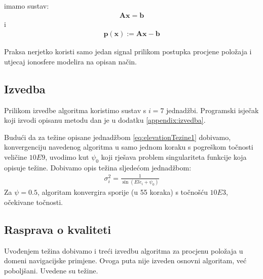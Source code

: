 \documentclass[a4paper,twoside,12pt]{memoir} %
\begin{document}
imamo sustav:
\begin{align*}
\mathbf{A}\mathbf{x} = \mathbf{b}
\end{align*} i
\begin{align*}
\mathbf{p}(\mathbf{x}) := \mathbf{A}\mathbf{x} - \mathbf{b}
\end{align*}


Praksa nerjetko koristi samo jedan signal prilikom postupka procjene položaja i utjecaj ionosfere modelira 
na opisan način.

\subsection{Izvedba }
Prilikom izvedbe algoritma koristimo sustav s $i = 7$ jednadžbi.
Programski isječak koji izvodi opisanu metodu dan je u dodatku \ref{appendix:izvedba}.

Budući da za težine opisane jednadžbom \ref{eq:elevationTezine1} dobivamo,
konvergenciju navedenog algoritma u samo jednom koraku s pogreškom točnosti veličine $10E9$,
uvodimo kut $\psi_0$ koji rješava problem singulariteta funkcije koja opisuje težine.
Dobivamo opis težina sljedećom jednadžbom:
\begin{align}\label{eq:elevationTezine2}
\sigma^2_i = \frac{1}{ \sin ( Ele_i + \psi_0) }
\end{align}
Za $\psi = 0.5$, algoritam konvergira sporije (u 55 koraka) s točnošću $10E3$, očekivane točnosti.

\subsection{Rasprava o kvaliteti}
Uvođenjem težina dobivamo i treći izvedbu algoritma za procjenu položaja u domeni navigacijske primjene. Ovoga puta nije izveden osnovni algoritam, već poboljšani. Uvedene su težine.
\end{document}
